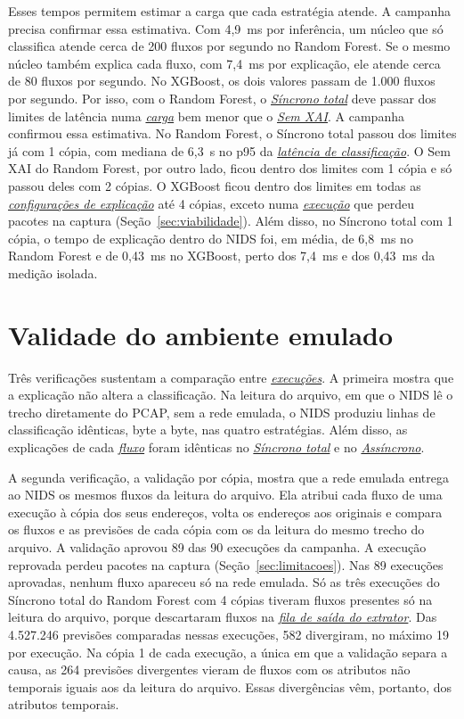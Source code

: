 \documentclass[
  12pt,
  oneside,
  a4paper,
  chapter=TITLE,
  sumario=tradicional,
  english,
  brazil
]{abntex2}
\newcommand{\termo}[2]{\hyperref[gl:#1]{\emph{#2}}}
\begin{document}
Esses tempos permitem estimar a carga que cada estratégia atende. A campanha precisa confirmar essa
estimativa. Com 4,9~ms por inferência, um núcleo que só classifica atende cerca de 200 fluxos por
segundo no Random Forest. Se o mesmo núcleo também explica cada fluxo, com 7,4~ms por explicação,
ele atende cerca de 80 fluxos por segundo. No XGBoost, os dois valores passam de 1.000 fluxos por
segundo. Por isso, com o Random Forest, o \termo{sincrono-total}{Síncrono total} deve passar dos
limites de latência numa \termo{carga}{carga} bem menor que o \termo{sem-xai}{Sem XAI}. A campanha
confirmou essa estimativa. No Random Forest, o Síncrono total passou dos limites já com 1 cópia, com
mediana de 6,3~s no p95 da \termo{latencia-classificacao}{latência de classificação}. O Sem XAI do
Random Forest, por outro lado, ficou dentro dos limites com 1 cópia e só passou deles com 2 cópias.
O XGBoost ficou dentro dos limites em todas as \termo{configuracao}{configurações de explicação} até 4 cópias, exceto numa
\termo{execucao}{execução} que perdeu pacotes na captura (Seção~\ref{sec:viabilidade}). Além disso,
no Síncrono total com 1 cópia, o tempo de explicação dentro do NIDS foi, em média, de 6,8~ms no
Random Forest e de 0,43~ms no XGBoost, perto dos 7,4~ms e dos 0,43~ms da medição isolada.

\section{Validade do ambiente emulado}
\label{sec:validade}

Três verificações sustentam a comparação entre \termo{execucao}{execuções}. A primeira mostra que a
explicação não altera a classificação. Na leitura do arquivo, em que o NIDS lê o trecho diretamente
do PCAP, sem a rede emulada, o NIDS produziu linhas de classificação idênticas, byte a byte, nas
quatro estratégias. Além disso, as explicações de cada \termo{fluxo}{fluxo} foram idênticas no
\termo{sincrono-total}{Síncrono total} e no \termo{assincrono}{Assíncrono}.

A segunda verificação, a validação por cópia, mostra que a rede emulada entrega ao NIDS os mesmos
fluxos da leitura do arquivo. Ela atribui cada fluxo de uma execução à cópia dos seus endereços,
volta os endereços aos originais e compara os fluxos e as previsões de cada cópia com os da leitura
do mesmo trecho do arquivo. A validação aprovou 89 das 90 execuções da campanha. A execução
reprovada perdeu pacotes na captura (Seção~\ref{sec:limitacoes}). Nas 89 execuções aprovadas,
nenhum fluxo apareceu só na rede emulada. Só as três execuções do Síncrono total do Random Forest
com 4 cópias tiveram fluxos presentes só na leitura do arquivo, porque descartaram fluxos na
\termo{fila-extrator}{fila de saída do extrator}. Das 4.527.246 previsões comparadas nessas
execuções, 582 divergiram, no máximo 19 por execução. Na cópia 1 de cada execução, a única em que a
validação separa a causa, as 264 previsões divergentes vieram de fluxos com os atributos não
temporais iguais aos da leitura do arquivo. Essas divergências vêm, portanto, dos atributos
temporais.
\end{document}
